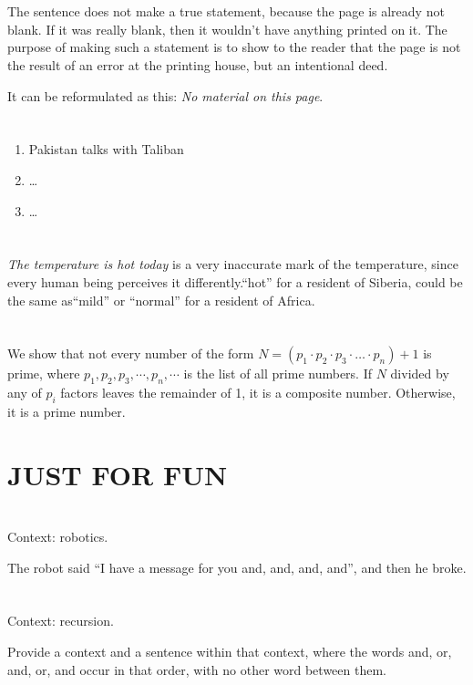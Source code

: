 \documentclass{article}
\begin{document}
\section{}

The sentence does not make a true statement, because the page is already not
blank. If it was really blank, then it wouldn't have anything printed on it.
The purpose of making such a statement is to show to the reader that the page
is not the result of an error at the printing house, but an intentional deed.

It can be reformulated as this: {\it No material on this page}.

\section{}

\begin{enumerate}
\item Pakistan talks with Taliban
\item \dots
\item \dots
\end{enumerate}

\section{}

{\it The temperature is hot today} is a very inaccurate mark of the temperature,
since every human being perceives it differently.``hot'' for a resident
of Siberia, could be the same as``mild'' or ``normal'' for a resident of Africa.

\section{}

We show that not every number of the form $N = (p_1 \cdot p_2 \cdot p_3 \cdot
\dots \cdot p_n) + 1$ is prime, where $p_1, p_2, p_3, \cdots, p_n, \cdots$ is
the list of all prime numbers. If $N$ divided by any of $p_i$ factors leaves the
remainder of 1, it is a composite number. Otherwise, it is a prime number.

\section*{JUST FOR FUN}
\setcounter{section}{0}

\section{}

Context: robotics.

The robot said ``I have a message for you and, and, and, and'', and then he
broke.

\section{}

Context: recursion.

Provide a context and a sentence within that context, where the words and, or,
and, or, and occur in that order, with no other word between them.
\end{document}
